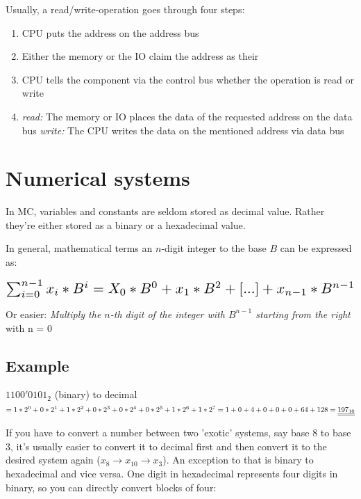 \documentclass[a4paper, 11pt, nofootinbib]{article}
\begin{document}
\noindent Usually, a read/write-operation goes through four steps:

\begin{enumerate}
	\item CPU puts the address on the address bus
	\item Either the memory or the IO claim the address as their
	\item CPU tells the component via the control bus whether the operation is read or write
	\item 
		\subitem \textit{read: } The memory or IO places the data of the requested address on the data bus
		\subitem \textit{write: } The CPU writes the data on the mentioned address via data bus
\end{enumerate}

\newpage

\section{Numerical systems}
In MC, variables and constants are seldom stored as decimal value. Rather they're either stored as a binary or a hexadecimal value. 

In general, mathematical terms an $n$-digit integer to the base $B$ can be expressed as:

\[ \scalebox{1.5}{$ \sum_{i=0}^{n-1} x_{i} * B^i = X_{0} * B^0 + x_{1} * B^2 + [...] + x_{n-1} * B^{n-1} $} \]

\noindent Or easier: \textit{Multiply the $n$-th digit of the integer with $B^{n-1}$ starting from the right} with n = 0

\subsection{Example}

\noindent $1100'0101_{2}$ (binary) to decimal \\
$
	= 1*2^0 + 0*2^1 + 1*2^2 + 0*2^3 + 0*2^4 + 0*2^5 + 1*2^6 + 1*2^7 \\
	=   1   +   0   +   4   +   0   +   0   +  0   +   64   +  128 \\
	=   \underline{\underline{197_{10}}}
$

\noindent If you have to convert a number between two 'exotic' systems, say base 8 to base 3, it's usually easier to convert it to decimal first and then convert it to the desired system again ($x_{8} \rightarrow x_{10} \rightarrow x_{3}$). An exception to that is binary to hexadecimal and vice versa. One digit in hexadecimal represents four digits in binary, so you can directly convert blocks of four:
\end{document}
